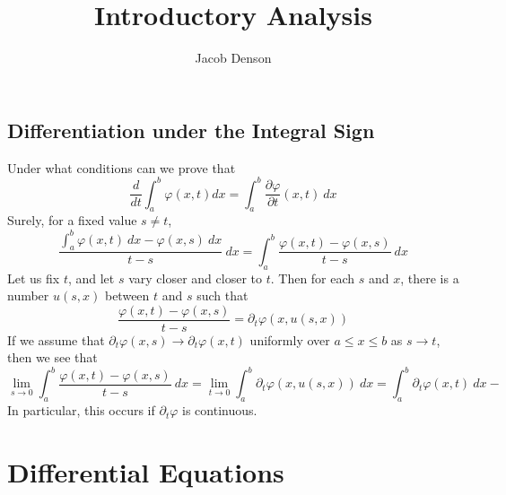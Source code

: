 

\title{Introductory Analysis}
\author{Jacob Denson}



\maketitle
\tableofcontents
{}

\section{Differentiation under the Integral Sign}

Under what conditions can we prove that
%
\[ \frac{d}{dt} \int_a^b \varphi(x,t) dx = \int_a^b \frac{\partial \varphi}{\partial t}(x,t)\ dx \]
%
Surely, for a fixed value $s \neq t$,
%
\[ \frac{\int_a^b \varphi(x,t)\ dx - \varphi(x,s)\ dx}{t - s}\ dx = \int_a^b \frac{\varphi(x,t) - \varphi(x,s)}{t - s}\ dx \]
%
Let us fix $t$, and let $s$ vary closer and closer to $t$. Then for each $s$ and $x$, there is a number $u(s,x)$ between $t$ and $s$ such that
%
\[ \frac{\varphi(x,t) - \varphi(x,s)}{t - s} = \partial_t \varphi(x,u(s,x)) \]
%
If we assume that $\partial_t \varphi(x,s) \to \partial_t \varphi(x,t)$ uniformly over $a \leq x \leq b$ as $s \to t$, then we see that
%
\[ \lim_{s \to 0} \int_a^b \frac{\varphi(x,t) - \varphi(x,s)}{t - s}\ dx = \lim_{t \to 0} \int_a^b \partial_t \varphi(x,u(s,x))\ dx = \int_a^b \partial_t \varphi(x,t)\ dx- \]
%
In particular, this occurs if $\partial_t \varphi$ is continuous.

\chapter{Differential Equations}

